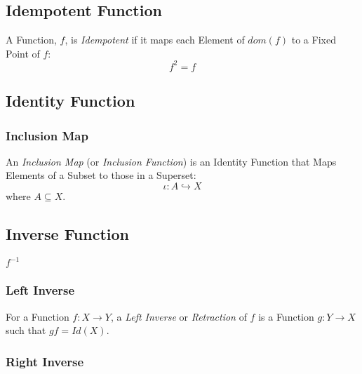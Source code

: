 \subsection{Idempotent Function}\label{sec:idempotent}

A Function, $f$, is \emph{Idempotent} if it maps each Element of
$dom(f)$ to a Fixed Point of $f$:
\[
  f^2 = f
\]



\subsection{Identity Function}\label{sec:identity_function}

\subsubsection{Inclusion Map}\label{sec:inclusion_map}

An \emph{Inclusion Map} (or \emph{Inclusion Function}) is an Identity
Function that Maps Elements of a Subset to those in a Superset:
\[
  \iota : A \hookrightarrow X
\]
where $A \subseteq X$.



\subsection{Inverse Function}\label{sec:inverse_function}

$f^{-1}$



\subsubsection{Left Inverse}\label{sec:left_inverse}

For a Function $f: X \rightarrow Y$, a \emph{Left Inverse} or
\emph{Retraction} of $f$ is a Function $g: Y \rightarrow X$ such that
$gf = Id(X)$.



\subsubsection{Right Inverse}\label{sec:right_inverse}

